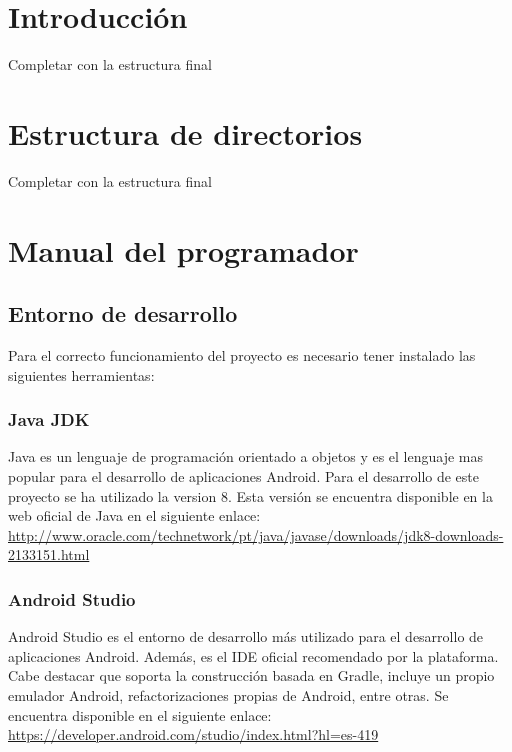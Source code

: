 
\section{Introducción}

Completar con la estructura final

\section{Estructura de directorios}

Completar con la estructura final

\section{Manual del programador}

\subsection{Entorno de desarrollo}

Para el correcto funcionamiento del proyecto es necesario tener instalado las siguientes herramientas:

\subsubsection{Java JDK}

Java es un lenguaje de programación orientado a objetos y es el lenguaje mas popular para el desarrollo de aplicaciones Android. Para el desarrollo de este proyecto se ha utilizado la version 8. Esta versión se encuentra disponible en la web oficial de Java en el siguiente enlace: \url{http://www.oracle.com/technetwork/pt/java/javase/downloads/jdk8-downloads-2133151.html}

\subsubsection{Android Studio}

Android Studio es el entorno de desarrollo más utilizado para el desarrollo de aplicaciones Android. Además, es el IDE oficial recomendado por la plataforma. Cabe destacar que soporta la construcción basada en Gradle, incluye un propio emulador Android, refactorizaciones propias de Android, entre otras. Se encuentra disponible en el siguiente enlace: \url{https://developer.android.com/studio/index.html?hl=es-419}

